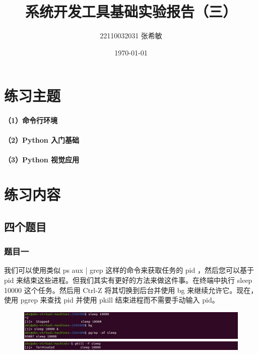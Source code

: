 \documentclass[a4paper, 12pt]{article}
\begin{document}
	\title{系统开发工具基础实验报告（三）}
	\author{22110032031 张希敏}
	\date{\today}
	\maketitle
	
	\tableofcontents
	\newpage
	
	\section{练习主题}
	\paragraph{（1）命令行环境}
	
	\paragraph{（2）Python 入门基础}
	
	\paragraph{（3）Python 视觉应用}
	
	\section{练习内容}
	
	\subsection{四个题目}
	
	\subsubsection{题目一}
	我们可以使用类似 ps aux | grep 这样的命令来获取任务的 pid ，然后您可以基于 pid 来结束这些进程。但我们其实有更好的方法来做这件事。在终端中执行 sleep 10000 这个任务。然后用 Ctrl-Z 将其切换到后台并使用 bg 来继续允许它。现在，使用 pgrep 来查找 pid 并使用 pkill 结束进程而不需要手动输入 pid。
	
	\begin{figure}[H]
		\centering
		\includegraphics[width=1\textwidth]{001.jpg}
		\includegraphics[width=1\textwidth]{007.jpg}
	\end{figure}
	
\end{document}
